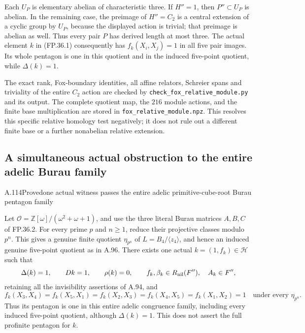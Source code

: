 Each $U_P$ is elementary abelian of characteristic three.
If $H''=1$, then $P''\subset U_P$ is abelian. In the remaining
case, the preimage of $H''=C_2$ is a central extension of a
cyclic group by $U_P$, because the displayed action is trivial;
that preimage is abelian as well. Thus every pair $P$ has
derived length at most three. The actual element $k$ in
(FP.36.1) consequently has $f_k(X_i,X_j)=1$ in all five pair
images. Its whole pentagon is one in this quotient and in the
induced five-point quotient, while $\Delta(k)=1$.

The exact rank, Fox-boundary identities, all affine relators,
Schreier spans and triviality of the entire $C_2$ action are
checked by \texttt{check\_fox\_relative\_module.py} and its
output. The complete quotient map, the $216$ module actions,
and the finite base multiplication are stored in
\texttt{fox\_relative\_module.npz}. This resolves this specific
relative homology test negatively; it does not rule out a
different finite base or a further nonabelian relative extension.

\subsection{A simultaneous actual obstruction to the entire adelic Burau family}


\begin{statement}{A.114}{Proved}{one actual witness passes the entire adelic primitive-cube-root Burau pentagon family}
\end{statement}
Let $\mathcal O=\mathbb Z[\omega]/(\omega^2+\omega+1)$,
and use the three literal Burau matrices $A,B,C$ of FP.36.2.
For every prime $p$ and $n\geq1$, reduce their projective
classes modulo $p^n$. This gives a genuine finite quotient
$\eta_{p^n}$ of $L=B_4/\langle z_4\rangle$, and hence an
induced genuine five-point quotient as in A.96.
There exists one actual $k=(1,f_k)\in\mathcal H$ such that
\[
 \Delta(k)=1,\qquad Dk=1,\qquad\rho(k)=0,\qquad
 f_k,\beta_k\in R_{\rm nil}(F''),\quad A_k\in F'',
\]
retaining all the invisibility assertions of A.94, and
\[
 f_k(X_3,X_4)=f_k(X_5,X_1)=f_k(X_2,X_3)
       =f_k(X_4,X_5)=f_k(X_1,X_2)=1
       \quad\text{under every }\eta_{p^n}.
\]
Thus its pentagon is one in this entire adelic congruence
family, including every induced five-point quotient, although
$\Delta(k)=1$. This does not assert the full profinite
pentagon for $k$.

